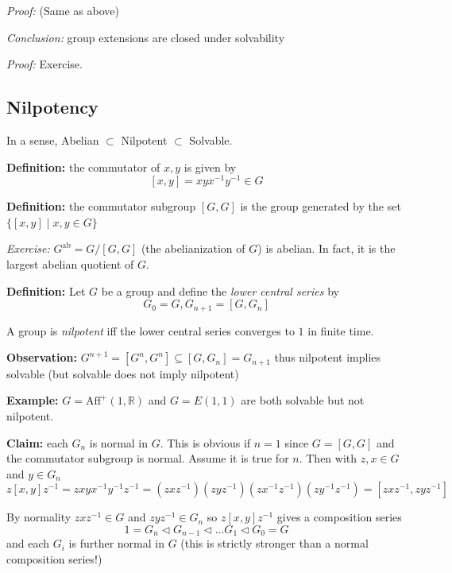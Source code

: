 \documentclass[12pt]{article}
\newcommand{\R}{\mathbb{R}}
\newenvironment*{tbox}[2][gray]{
    \begin{tcolorbox}[
        parbox=false,
        colback=#1!5!white,
        colframe=#1!75!black,
        breakable,
        title={#2}
    ]}
    {\end{tcolorbox}}
\begin{document}
    \begin{tbox}{\textbf{Lemma:} If $\phi:G \twoheadrightarrow H$ and $G$ is solvable then $H$ is solvable}
        \emph{Proof:} (Same as above)
    \end{tbox}

    \begin{tbox}{\textbf{Lemma:} If $N \hookrightarrow G \twoheadrightarrow H$, $G$ is solvable iff both $N$ and $H$ are solvable.}
        \emph{Conclusion:} group extensions are closed under solvability
        
        \emph{Proof:} Exercise. 
    \end{tbox}

\subsection*{Nilpotency} 
    In a sense, Abelian $\subset$ Nilpotent $\subset$ Solvable. 

    \textbf{Definition:} the commutator of $x, y$ is given by 
    \[[x, y] = xyx^{-1}y^{-1} \in G\]

    \textbf{Definition:} the commutator subgroup $[G, G]$ is the group generated by the set $\{[x, y] \; | \; x, y \in G\}$

    \emph{Exercise:} $G^{\text{ab}} = G/[G, G]$ (the abelianization of $G$) is abelian. In fact, it is the largest abelian quotient of $G$. 

    \textbf{Definition:} Let $G$ be a group and define the \emph{lower central series} by  
    \[G_0 = G, G_{n+1} = [G, G_n]\] 
    
    A group is \emph{nilpotent} iff the lower central series converges to $1$ in finite time. 

    \textbf{Observation:} $G^{n+1} = [G^n, G^n] \subseteq [G, G_n] = G_{n+1}$ thus nilpotent implies solvable (but solvable does not imply nilpotent)

    \textbf{Example:} $G = \text{Aff}^+(1, \R)$ and $G = E(1, 1)$ are both solvable but not nilpotent.

    \textbf{Claim:} each $G_n$ is normal in $G$. This is obvious if $n=1$ since $G = [G, G]$ and the commutator subgroup is normal. Assume it is true for $n$. Then with $z, x \in G$ and $y \in G_n$
    \[z[x, y]z^{-1} = zxyx^{-1}y^{-1}z^{-1} = (zxz^{-1})(zyz^{-1})(zx^{-1}z^{-1})(zy^{-1}z^{-1}) = [zxz^{-1}, zyz^{-1}]\] 

    By normality $zxz^{-1} \in G$ and $zyz^{-1} \in G_n$ so $z[x,y]z^{-1}$ gives a composition series 
    \[1 = G_n \triangleleft G_{n-1} \triangleleft \dots G_1 \triangleleft G_0 = G\]
    and each $G_i$ is further normal in $G$ (this is strictly stronger than a normal composition series!)
\end{document}
